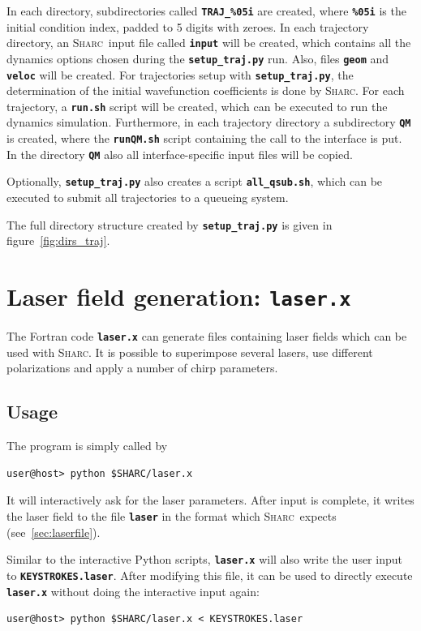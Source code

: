 \documentclass[a4paper,11pt,DIV=15,openany,twoside=false]{scrbook}
\newcommand{\sharc}{\textsc{Sharc}}
\newcommand{\ttt}[1]{\textbf{\texttt{#1}}}
\begin{document}
In each directory, subdirectories called \ttt{TRAJ\_\%05i} are created, where \ttt{\%05i} is the initial condition index, padded to 5 digits with zeroes. In each trajectory directory, an \sharc\ input file called \ttt{input} will be created, which contains all the dynamics options chosen during the \ttt{setup\_traj.py} run. Also, files \ttt{geom} and \ttt{veloc} will be created. For trajectories setup with \ttt{setup\_traj.py}, the determination of the initial wavefunction coefficients is done by \sharc.
For each trajectory, a \ttt{run.sh} script will be created, which can be executed to run the dynamics simulation. 
Furthermore, in each trajectory directory a subdirectory \ttt{QM} is created, where the \ttt{runQM.sh} script containing the call to the interface is put. In the directory \ttt{QM} also all interface-specific input files will be copied.

Optionally, \ttt{setup\_traj.py} also creates a script \ttt{all\_qsub.sh}, which can be executed to submit all trajectories to a queueing system.

The full directory structure created by \ttt{setup\_traj.py} is given in figure~\ref{fig:dirs_traj}.



\section{Laser field generation: \ttt{laser.x}}\label{sec:laser.x}

The Fortran code \ttt{laser.x} can generate files containing laser fields which can be used with \sharc. It is possible to superimpose several lasers, use different polarizations and apply a number of chirp parameters.

\subsection{Usage}

The program is simply called by 
\begin{verbatim}
user@host> python $SHARC/laser.x
\end{verbatim}
It will interactively ask for the laser parameters. After input is complete, it writes the laser field to the file \ttt{laser} in the format which \sharc\ expects (see~\ref{sec:laserfile}).

Similar to the interactive Python scripts, \ttt{laser.x} will also write the user input to \ttt{KEYSTROKES.laser}. After modifying this file, it can be used to directly execute \ttt{laser.x} without doing the interactive input again:
\begin{verbatim}
user@host> python $SHARC/laser.x < KEYSTROKES.laser
\end{verbatim}
\end{document}
